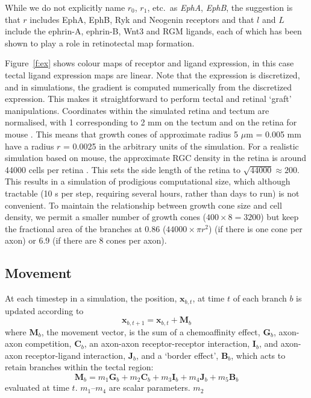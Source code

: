 \documentclass[11pt, a4paper]{article}
\begin{document}
While we do not explicitly name $r_0$, $r_1$,
etc.~as \emph{EphA}, \emph{EphB}, the suggestion is that $r$ includes EphA,
EphB, Ryk \citep{schmitt_wntryk_2006} and
Neogenin \citep{rajagopalan_neogenin_2004} receptors and that $l$ and $L$
include the ephrin-A, ephrin-B, Wnt3 \citep{schmitt_wntryk_2006} and
RGM \citep{monnier_rgm_2002} ligands, each of which has been shown to play a
role in retinotectal map formation.

Figure~\ref{f:ex} shows colour maps of receptor and ligand expression, in this
case tectal ligand expression maps are linear. Note that the expression is
discretized, and in simulations, the gradient is computed numerically from the
discretized expression. This makes it straightforward to perform tectal and
retinal `graft' manipulations. Coordinates within the simulated retina and
tectum are normalised, with 1 corresponding to 2 mm on the tectum and on the
retina for mouse \citep{reber_relative_2004}. This means that growth cones of
approximate radius 5 $\mu$m = 0.005 mm \citep{goodhill_molecular_2016} have a
radius $r$ = 0.0025 in the arbitrary units of the simulation. For a realistic
simulation based on mouse, the approximate RGC density in the retina is around
44000 cells per retina \citep{jeon_major_1998}. This sets the side length of
the retina to $\sqrt{44000} \approx 200$. This results in a simulation of
prodigious computational size, which although tractable (10 s per step,
requiring several hours, rather than days to run) is not convenient. To
maintain the relationship between growth cone size and cell density, we permit
a smaller number of growth cones ($400\times8=3200$) but keep the fractional
area of the branches at 0.86 ($44000 \times \pi r^2$) (if there is one cone
per axon) or 6.9 (if there are 8 cones per axon).

\subsection*{Movement}

At each timestep in a simulation, the position, $\mathbf{x}_{b,t}$, at time
$t$ of each branch $b$ is updated according to
%
\begin{equation}
\mathbf{x}_{b,t+1} = \mathbf{x}_{b,t} + \mathbf{M}_{b}
\end{equation}
%
where $\mathbf{M}_{b}$, the movement vector, is the sum of a chemoaffinity
effect, $\mathbf{G}_b$, axon-axon competition, $\mathbf{C}_b$, an axon-axon
receptor-receptor interaction, $\mathbf{I}_b$, and axon-axon receptor-ligand
interaction, $\mathbf{J}_b$, and a `border effect',
$\mathbf{B}_b$, which acts to retain branches within the tectal region:
%
\begin{equation}
\mathbf{M}_{b} = m_1 \mathbf{G}_b + m_2 \mathbf{C}_b + m_3 \mathbf{I}_b +
m_4 \mathbf{J}_b + m_5 \mathbf{B}_b
\end{equation}
%
evaluated at time $t$. $m_1$--$m_4$ are scalar parameters. $m_2$
\end{document}
